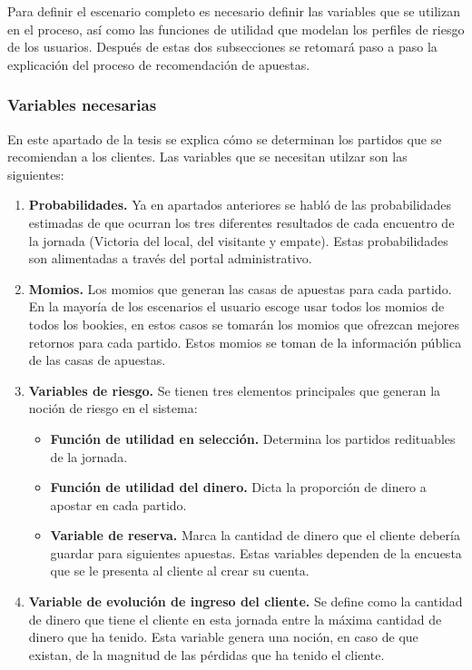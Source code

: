 Para definir el escenario completo es necesario definir las variables que se utilizan en el proceso, así como las funciones de utilidad que modelan los perfiles de riesgo de los usuarios. Después de estas dos subsecciones se retomará paso a paso la explicación del proceso de recomendación de apuestas.
 
\subsubsection{Variables necesarias}

En este apartado de la tesis se explica cómo se determinan los partidos que se recomiendan a los clientes.
Las variables que se necesitan utilzar son las siguientes:
\begin{enumerate}
	\item \textbf{Probabilidades.} Ya en apartados anteriores se habló de las probabilidades estimadas de que ocurran los tres diferentes resultados de cada encuentro de la jornada (Victoria del local, del visitante y empate). Estas probabilidades son alimentadas a través del portal administrativo.
	
	\item \textbf{Momios.} Los momios que generan las casas de apuestas para cada partido. En la mayoría de los escenarios el usuario escoge usar todos los momios de todos los bookies, en estos casos se tomarán los momios que ofrezcan mejores retornos para cada partido. Estos momios se toman de la información pública de las casas de apuestas.
	
	\item \textbf{Variables de riesgo.} Se tienen tres elementos principales que generan la noción de riesgo en el sistema:
	\begin{itemize}
		\item \textbf{Función de utilidad en selección.} Determina los partidos redituables de la jornada.
		\item \textbf{Función de utilidad del dinero.} Dicta la proporción de dinero a apostar en cada partido.
		\item \textbf{Variable de reserva.} Marca la cantidad de dinero que el cliente debería guardar para siguientes apuestas.
		Estas variables dependen de la encuesta que se le presenta al cliente al crear su cuenta.
	\end{itemize}
	
	\item \textbf{Variable de evolución de ingreso del cliente.} Se define como la cantidad de dinero que tiene el cliente en esta jornada entre la máxima cantidad de dinero que ha tenido. Esta variable genera una noción, en caso de que existan, de la magnitud de las pérdidas que ha tenido el cliente.
\end{enumerate}

